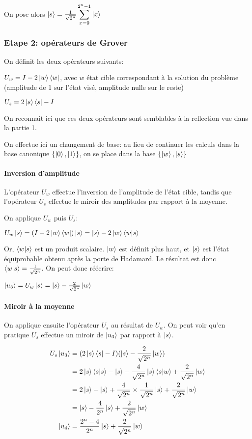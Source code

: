 On pose alors $\ket{s} = \frac{1}{\sqrt{2^n}} \displaystyle\sum_{x=0}^{2^n-1} \ket{x}$

\subsubsection*{Etape 2: opérateurs de Grover}

On définit les deux opérateurs suivants:

$U_w = I - 2\ket{w}\bra{w}$, avec $w$ état cible correspondant à la solution du problème (amplitude de 1 sur l'état visé, amplitude nulle sur le reste)

$U_s = 2\ket{s}\bra{s} - I$

\begin{rem}
    On reconnait ici que ces deux opérateurs sont semblables à la reflection vue dans la partie 1.
\end{rem}

\medbreak
On effectue ici un changement de base: au lieu de continuer les calculs dans la base canonique $\{\ket{0}, \ket{1}\}$, on se place dans la base $\{\ket{w}, \ket{s}\}$

\paragraph*{Inversion d'amplitude}

L'opérateur $U_w$ effectue l'inversion de l'amplitude de l'état cible, tandis que l'opérateur $U_s$ effectue le miroir des amplitudes par rapport à la moyenne.

On applique $U_w$ puis $U_s$:

$U_w \ket{s} = (I - 2 \ket{w}\bra{w})\ket{s} \nonumber = \ket{s} - 2 \ket{w}\braket{w|s}$

Or, $\braket{w|s}$ est un produit scalaire. $\ket{w}$ est définit plus haut, et $\ket{s}$ est l'état équiprobable obtenu après la porte de Hadamard. Le résultat est donc $\braket{w|s} = \frac{1}{\sqrt{2^n}}$. On peut donc réécrire:

$\ket{u_3} = U_w \ket{s} = \ket{s} - \frac{2}{\sqrt{2^n}}\ket{w}$

\paragraph*{Miroir à la moyenne}
On applique ensuite l'opérateur $U_s$ au résultat de $U_w$. On peut voir qu'en pratique $U_s$ effectue un miroir de $\ket{u_3}$ par rapport à $\ket{s}$.

\begin{align}
  U_s\ket{u_3} 
  &= (2\ket{s}\bra{s} - I)(\ket{s} - \frac{2}{\sqrt{2^n}}\ket{w}) \nonumber \\
  &= 2\ket{s}\braket{s|s} - \ket{s} - \frac{4}{\sqrt{2^n}} \ket{s} \braket{s|w} + \frac{2}{\sqrt{2^n}}\ket{w} \nonumber \\
  &= 2\ket{s} - \ket{s} + \frac{4}{\sqrt{2^n}} \times \frac{1}{\sqrt{2^n}} \ket{s} + \frac{2}{\sqrt{2^n}}\ket{w} \nonumber \\
  &= \ket{s} - \frac{4}{2^n} \ket{s} + \frac{2}{\sqrt{2^n}}\ket{w} \nonumber \\
  \ket{u_4}&=\frac{2^n - 4}{2^n}\ket{s} + \frac{2}{\sqrt{2^n}}\ket{w}
\end{align}

